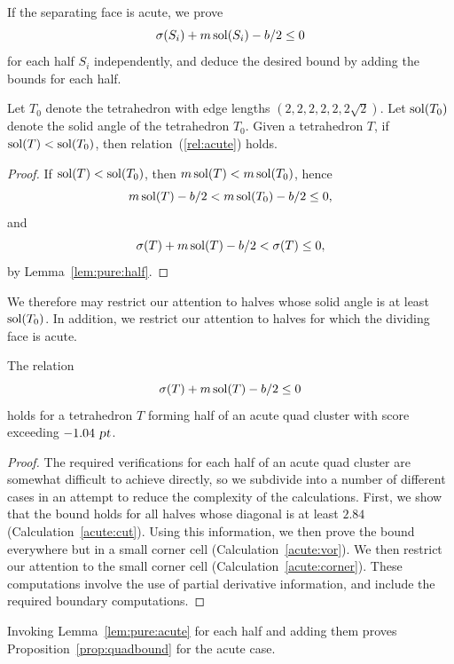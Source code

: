If the separating face is acute, we prove
\begin{equation}
\operatorname{\sigma}(S_i) + m \operatorname{sol}(S_i) - b/2 \le 0 \label{rel:acute}
\end{equation}
for each half $S_i$
independently, and deduce the desired bound by adding the bounds
for each half.

\begin{lem}
\label{lem:pure:solid}
Let $T_0$ denote the tetrahedron with edge lengths $(2,2,2,2,2,2\sqrt{2})$.  Let
$\operatorname{sol}(T_0)$ denote the solid angle of the tetrahedron $T_0$.
Given a tetrahedron $T$, if $\operatorname{sol}(T) < \operatorname{sol}(T_0)$, then relation~(\ref{rel:acute}) holds.
\end{lem}
\begin{proof}
If $\operatorname{sol}(T) < \operatorname{sol}(T_0)$, then
$m \operatorname{sol}(T) < m \operatorname{sol}(T_0)$, hence
\[m \operatorname{sol}(T) -b/2 < m \operatorname{sol}(T_0) - b/2 \le 0,\]
and
\[\operatorname{\sigma}(T) + m \operatorname{sol}(T) -b/2 < \operatorname{\sigma}(T) \le 0,\]
by Lemma~\ref{lem:pure:half}.
\end{proof}

We therefore
may restrict our attention to halves whose solid angle is at least
$\operatorname{sol}(T_0)$.  In addition, we restrict our attention to halves for
which the dividing face is acute.

\begin{lem}
\label{lem:pure:acute}
The relation \[\operatorname{\sigma}(T) + m \operatorname{sol}(T) - b/2 \le 0\] holds for a
tetrahedron $T$ forming  half of an acute quad cluster with
score exceeding $-1.04 \text{ \sl pt}$.
\end{lem}
\begin{proof}
The required verifications for each half of an acute quad cluster
are somewhat difficult to achieve
directly, so we subdivide into a number of different cases
in an attempt to reduce the complexity of
the calculations.  First, we show that the bound holds for
all halves whose diagonal is at least $2.84$
(Calculation~\ref{acute:cut}).
Using this information, we then prove the
bound everywhere but in a small corner cell
(Calculation~\ref{acute:vor}).  We then restrict our
attention to the small corner cell (Calculation~\ref{acute:corner}).
These computations involve
the use of partial derivative information, and include the required
boundary computations.
\end{proof}

Invoking Lemma~\ref{lem:pure:acute} for each half and adding them proves
Proposition~\ref{prop:quadbound} for the acute case.


